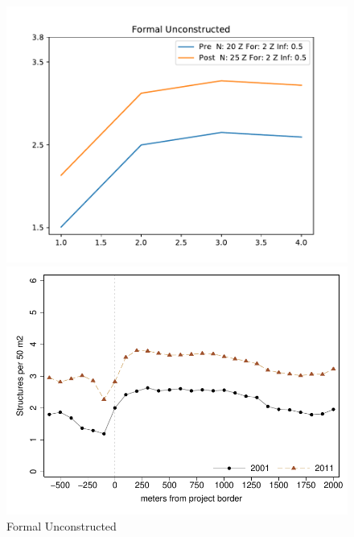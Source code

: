 \documentclass[12pt]{article}
\begin{document}
\begin{figure}[b]
\caption{Formal Unconstructed}\label{fig1}
\centering
\begin{minipage}[b]{.4\textwidth}
\centering
\includegraphics[scale=.48]{figures/unconstructed_formal.pdf}
\end{minipage}
\begin{minipage}[b]{.4\textwidth}
\centering
\includegraphics[scale=.5]{figures/bblu_for_placebo_admin.pdf}
\end{minipage}
\end{figure}
\end{document}
